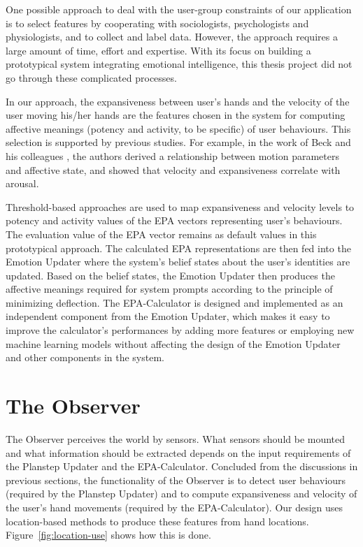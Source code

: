 One possible approach to deal with the user-group constraints of our application is to select features by cooperating with sociologists, psychologists and physiologists, and to collect and label data. However, the approach requires a large amount of time, effort and expertise. With its focus on building a prototypical system integrating emotional intelligence, this thesis project did not go through these complicated processes. 

In our approach, the expansiveness between user's hands and the velocity of the user moving his/her hands are the features chosen in the system for computing affective meanings (potency and activity, to be specific) of user behaviours. This selection is supported by previous studies. For example, in the work of Beck and his colleagues \cite{beck2010interpretation}, the authors derived a relationship between motion parameters and affective state, and showed that velocity and expansiveness correlate with arousal.

Threshold-based approaches are used to map expansiveness and velocity levels to potency and activity values of the EPA vectors representing user's behaviours. The evaluation value of the EPA vector remains as default values in this prototypical approach. The calculated EPA representations are then fed into the Emotion Updater where the system's belief states about the user's identities are updated. Based on the belief states, the Emotion Updater then produces the affective meanings required for system prompts according to the principle of minimizing deflection. The EPA-Calculator is designed and implemented as an independent component from the Emotion Updater, which makes it easy to improve the calculator's performances by adding more features or employing new machine learning models without affecting the design of the Emotion Updater and other components in the system.

\section{The Observer}

The Observer perceives the world by sensors. What sensors should be mounted and what information should be extracted depends on the input requirements of the Planstep Updater and the EPA-Calculator. Concluded from the discussions in previous sections, the functionality of the Observer is to detect user behaviours (required by the Planstep Updater) and to compute expansiveness and velocity of the user's hand movements (required by the EPA-Calculator). Our design uses location-based methods to produce these features from hand locations. Figure~\ref{fig:location-use} shows how this is done.

